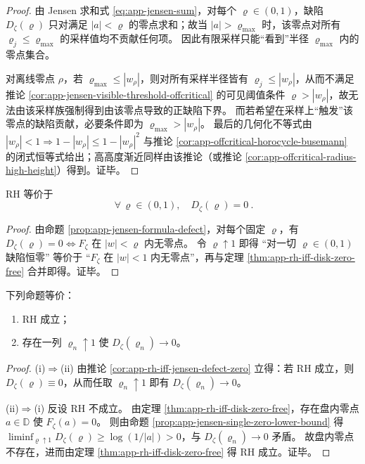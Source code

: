 \begin{proof}
由 Jensen 求和式 \eqref{eq:app-jensen-sum}，对每个 \(\varrho\in(0,1)\)，缺陷 \(D_{\zeta}(\varrho)\) 只对满足 \(|a|<\varrho\) 的零点求和；故当 \(|a|>\varrho_{\max}\) 时，该零点对所有 \(\varrho_j\le\varrho_{\max}\) 的采样值均不贡献任何项。
因此有限采样只能“看到”半径 \(\varrho_{\max}\) 内的零点集合。
\par
对离线零点 \(\rho\)，若 \(\varrho_{\max}\le |w_{\rho}|\)，则对所有采样半径皆有 \(\varrho_j\le |w_{\rho}|\)，从而不满足推论 \ref{cor:app-jensen-visible-threshold-offcritical} 的可见阈值条件 \(\varrho>|w_{\rho}|\)，故无法由该采样族强制得到由该零点导致的正缺陷下界。
而若希望在采样上“触发”该零点的缺陷贡献，必要条件即为 \(\varrho_{\max}>|w_{\rho}|\)。
最后的几何化不等式由 \(|w_{\rho}|<1\Rightarrow 1-|w_{\rho}|\le 1-|w_{\rho}|^{2}\) 与推论 \ref{cor:app-offcritical-horocycle-busemann} 的闭式恒等式给出；高高度渐近同样由该推论（或推论 \ref{cor:app-offcritical-radius-high-height}）得到。证毕。
\end{proof}

\begin{corollary}\label{cor:app-rh-iff-jensen-defect-zero}
RH 等价于
\[
\boxed{\ \forall\,\varrho\in(0,1),\quad D_{\zeta}(\varrho)=0\ }.
\]
\end{corollary}
\begin{proof}
由命题 \ref{prop:app-jensen-formula-defect}，对每个固定 \(\varrho\)，有 \(D_{\zeta}(\varrho)=0\iff F_{\zeta}\) 在 \(|w|<\varrho\) 内无零点。
令 \(\varrho\uparrow 1\) 即得 “对一切 \(\varrho\in(0,1)\) 缺陷恒零” 等价于 “\(F_{\zeta}\) 在 \(|w|<1\) 内无零点”，再与定理 \ref{thm:app-rh-iff-disk-zero-free} 合并即得。证毕。
\end{proof}

\begin{theorem}[趋近边界的缺陷趋零判据]\label{thm:app-rh-iff-jensen-defect-vanishing-sequence}
下列命题等价：
\begin{enumerate}
  \item[(i)] RH 成立；
  \item[(ii)] 存在一列 \(\varrho_n\uparrow 1\) 使 \(D_{\zeta}(\varrho_n)\to 0\)。
\end{enumerate}
\end{theorem}
\begin{proof}
(i)\(\Rightarrow\)(ii) 由推论 \ref{cor:app-rh-iff-jensen-defect-zero} 立得：若 RH 成立，则 \(D_{\zeta}(\varrho)\equiv 0\)，从而任取 \(\varrho_n\uparrow 1\) 即有 \(D_{\zeta}(\varrho_n)\to 0\)。
\par
(ii)\(\Rightarrow\)(i) 反设 RH 不成立。
由定理 \ref{thm:app-rh-iff-disk-zero-free}，存在盘内零点 \(a\in\mathbb{D}\) 使 \(F_{\zeta}(a)=0\)。
则由命题 \ref{prop:app-jensen-single-zero-lower-bound} 得
\(
\liminf_{\varrho\uparrow 1}D_{\zeta}(\varrho)\ge \log(1/|a|)>0
\)，与 \(D_{\zeta}(\varrho_n)\to 0\) 矛盾。
故盘内零点不存在，进而由定理 \ref{thm:app-rh-iff-disk-zero-free} 得 RH 成立。证毕。
\end{proof}

